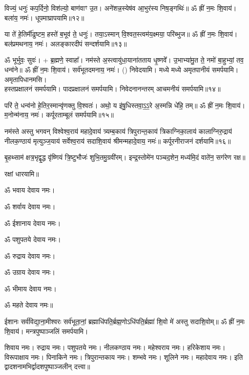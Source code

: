 \begingroup
\centering
\setlength{\columnseprule}{1pt}
\let\chapt\sect


\endgroup




विज्यं॒ धनुः॑ कप॒र्दिनो॒ विश॑ल्यो॒ बाण॑वाꣳ उ॒त। अने॑शन्न॒\-स्येष॑व आ॒भुर॑स्य निष॒ङ्गथिः॑॥ ॐ ह्रीं न॒मः शि॒वाय॑। बला॑य॒ नमः॑। धूपमाघ्रापयामि॥१२॥

या ते॑ हे॒तिर्मी॑ढुष्टम॒ हस्ते॑ ब॒भूव॑ ते॒ धनुः॑। तया॒ऽस्मान् वि॒श्वत॒स्त्वम॑य॒क्ष्मया॒ परि॑ब्भुज॥ ॐ ह्रीं न॒मः शि॒वाय॑। बल॑प्रमथनाय॒ नमः॑। अलङ्कारदीपं सन्दर्शयामि॥१३॥

ॐ भूर्भुवः॒ सुवः॑। + ब्र॒ह्मणे॒ स्वाहा᳚। नम॑स्ते अ॒स्त्वायु॑धा॒याना॑तताय धृ॒ष्णवे᳚। उ॒भाभ्या॑मु॒त ते॒ नमो॑ बा॒हुभ्यां॒ तव॒ धन्व॑ने॥ ॐ ह्रीं न॒मः शि॒वाय॑। सर्व॑भूतदमनाय॒ नमः॑। () निवेदयामि। मध्ये मध्ये अमृतपानीयं समर्पयामि। अमृतापिधानमसि।\\
हस्तप्रक्षालनं समर्पयामि। पादप्रक्षालनं समर्पयामि। निवेदनानन्तरम् आचमनीयं समर्पयामि॥१४॥

परि॑ ते॒ धन्व॑नो हे॒तिर॒स्मान्वृ॑णक्तु वि॒श्वतः॑। अथो॒ य इ॑षु॒धिस्तवा॒ऽ॒ऽ॒रे अ॒स्मन्नि धे॑हि॒ तम्॥ ॐ ह्रीं न॒मः शि॒वाय॑। म॒नोन्म॑नाय॒ नमः॑। कर्पूरताम्बूलं समर्पयामि॥१५॥

नम॑स्ते अस्तु भगवन् विश्वेश्व॒राय॑ महादे॒वाय॑ त्र्यम्ब॒काय॑ त्रिपुरान्त॒काय॑ त्रिकाग्निका॒लाय॑ कालाग्निरु॒द्राय॑ नीलक॒ण्ठाय॑ मृत्युञ्ज॒याय॑ सर्वेश्व॒राय॑ सदाशि॒वाय॑ श्रीमन्महादे॒वाय॒ नमः॑॥ कर्पूरनीराजनं दर्शयामि॥१६॥

बृ॒हथ्साम॑ क्षत्र॒भृद्वृ॒द्ध वृ॑ष्णियं त्रि॒ष्टुभौजः॑ शुभि॒तमु॒ग्रवी॑रम्।
इन्द्र॒स्तोमे॑न पञ्चद॒शेन॒ मध्य॑मि॒दं वाते॑न॒ सग॑रेण रक्ष॥

रक्षां धारयामि॥

ॐ भवाय देवाय नमः। 

ॐ शर्वाय देवाय नमः। 

ॐ ईशानाय देवाय नमः। 

ॐ पशुपतये देवाय नमः। 

ॐ रुद्राय देवाय नमः। 

ॐ उग्राय देवाय नमः। 

ॐ भीमाय देवाय नमः। 

ॐ महते देवाय नमः॥


ईशानः सर्व॑विद्या॒ना॒मीश्वरः सर्व॑भूता॒नां॒ ब्रह्माधि॑पति॒र्ब्रह्म॒णो\-ऽधि॑पति॒र्ब्रह्मा॑ शि॒वो मे॑ अस्तु सदाशि॒वोम्॥ ॐ ह्रीं न॒मः शि॒वाय॑। मन्त्रपुष्पाञ्जलिं समर्पयामि।   


शिवाय नमः। रुद्राय नमः। पशुपतये नमः। नीलकण्ठाय नमः। महेश्वराय नमः। हरिकेशाय नमः। विरूपाक्षाय नमः। पिनाकिने नमः। त्रिपुरान्तकाय नमः। शम्भवे नमः। शूलिने नमः। महादेवाय नमः। इति द्वादशनामभिर्द्वादशपुष्पाञ्जलीन् दत्त्वा॥

